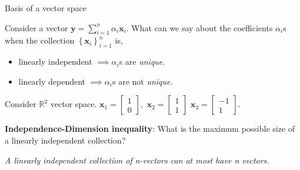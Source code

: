 \documentclass[aspectratio=169]{beamer}
\begin{document}
\begin{frame}[t]{Basis of a vector space}
  \begin{small}
    \noindent Consider a vector $\mathbf{y} = \sum_{i=1}^n\alpha_i\mathbf{x}_i$. What can we say about the coefficients $\alpha_i$s when the collection $\left\{\mathbf{x}_i\right\}_{i=1}^n$ is,
    \begin{itemize}
      \item linearly independent $\implies \alpha_i$s are \textit{unique}.
      \item linearly dependent $\implies \alpha_i$s are not \textit{unique}.
    \end{itemize}
    
    Consider $\mathbb{R}^2$ vector space. $\mathbf{x}_1=\begin{bmatrix}1\\0\end{bmatrix}, \,\, \mathbf{x}_2=\begin{bmatrix}1\\1\end{bmatrix} \,\, \mathbf{x}_3 = \begin{bmatrix}-1\\1\end{bmatrix}$.
    \begin{center}
    \end{center}
    \noindent \textbf{Independence-Dimension inequality}: What is the maximum possible size of a linearly independent collection?
    \begin{center}\textit{A linearly independent collection of n-vectors can at most have n vectors.}\end{center}
  \end{small}
\end{frame}
\end{document}

